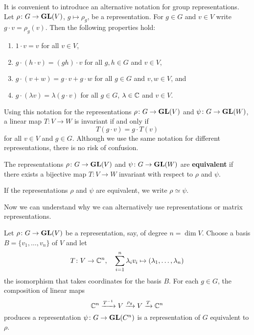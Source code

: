 It is convenient to introduce an alternative
notation for group representations. 
Let $\rho\colon G\to\mathbf{GL}(V)$, $g\mapsto \rho_g$, be a representation. For
$g\in G$ and $v\in V$ write $g\cdot v=\rho_g(v)$. Then the following properties hold: 
\begin{enumerate}
	\item $1\cdot v=v$ for all $v\in V$, 
	\item $g\cdot (h\cdot v)=(gh)\cdot v$ for all $g,h\in G$ and $v\in V$, 
	\item $g\cdot (v+w)=g\cdot v+g\cdot w$ for all $g\in G$ and $v,w\in V$, and 
	\item $g\cdot (\lambda v)=\lambda (g\cdot v)$ for all $g\in G$, $\lambda\in\mathbb{C}$ and $v\in V$.  	
\end{enumerate}
Using this notation for the representations $\rho\colon G\to\mathbf{GL}(V)$ 
and $\psi\colon G\to\mathbf{GL}(W)$, a linear
map $T\colon V\to W$ is invariant if and only if
\[
T(g\cdot v)=g\cdot T(v)
\]
for all $v\in V$ and $g\in G$. 
Although we use the same notation for different representations, there is no risk of confusion. 

\begin{definition}
    The representations $\rho\colon G\to\mathbf{GL}(V)$ and $\psi\colon G\to\mathbf{GL}(W)$ are \textbf{equivalent}
    if there exists a bijective map $T\colon V\to W$ invariant with respect to $\rho$ and $\psi$.
\end{definition}

If the representations $\rho$ and 
$\psi$ are equivalent, we write 
$\rho\simeq\psi$. 

Now we can understand why we can alternatively use
representations or matrix representations. 

\begin{example}
\label{xca:change_of_basis}
Let $\rho\colon G\to\mathbf{GL}(V)$ be a representation, say, of degree 
$n=\dim V$. Choose a basis 
$B=\{v_1,\dots,v_n\}$ of $V$ and let 
\[
T\colon V\to\mathbb{C}^n,
\quad
\sum_{i=1}^n\lambda_iv_i\mapsto (\lambda_1,\dots,\lambda_n)
\]
the isomorphism that takes coordinates 
for the basis $B$. For each $g\in G$, 
the composition of linear maps 
\[
\mathbb{C}^n\xrightarrow[]{T^{-1}}V\xrightarrow[]{\rho_g} V
\xrightarrow[]{T}\mathbb{C}^n
\]
produces a representation 
$\psi\colon G\to\mathbf{GL}(C^n)$
is a representation 
of $G$ equivalent to $\rho$.   
\end{example}


